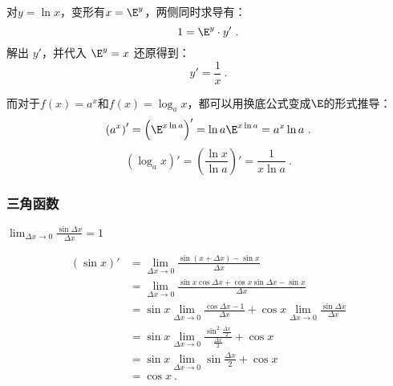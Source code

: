 对$y=\ln x$，变形有$x=\E^y$，两侧同时求导有：
\begin{equation}
1=\E^y\cdot y'~.
\end{equation}
解出 $y'$，并代入 $\displaystyle \E^y=x$ 还原得到：
\begin{equation}
y'=\frac{1}{x}~.
\end{equation}

而对于$f(x)=a^x$和$f(x)=\log_a x$，都可以用换底公式变成$\E$的形式推导：
\begin{equation}
\left(a^x\right)'=\left(\E^{x\ln a}\right)'=\ln a\E^{x\ln a}=a^x\ln a~.
\end{equation}
\begin{equation}
\left(\log_a x\right)'=\left(\frac{\ln x}{\ln a}\right)'=\frac{1}{x\ln a}~.
\end{equation}

\subsubsection{三角函数}


$\displaystyle\lim_{\Delta x \to 0}\frac{\sin\Delta x} {\Delta x}=1$

\begin{equation}
\begin{split}
\left(\sin x\right)' &= \lim_{\Delta x \to 0}\frac{\sin (x+\Delta x)-\sin x}{\Delta x} \\
&= \lim_{\Delta x \to 0}\frac{\sin x\cos\Delta x+\cos x\sin\Delta x-\sin x}{\Delta x} \\
&= \sin x\lim_{\Delta x \to 0}\frac{\cos\Delta x-1}{\Delta x}+\cos x\lim_{\Delta x \to 0}\frac{\sin\Delta x} {\Delta x}\\
&= \sin x\lim_{\Delta x \to 0}\frac{\sin^2\frac{\Delta x}{2}}{\frac{\Delta x}{2}}+\cos x\\
&= \sin x\lim_{\Delta x \to 0}\sin\frac{\Delta x}{2}+\cos x\\
&=\cos x~.
\end{split}
\end{equation}

